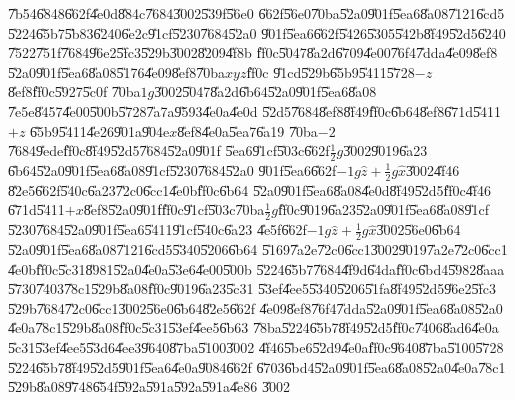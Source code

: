 \U{7b54}\U{6848}\U{662f}\U{4e0d}\U{884c}\U{7684}\U{3002}\U{539f}\U{56e0}%
\U{662f}\U{56e0}\U{70ba}\U{52a0}\U{901f}\U{5ea6}\U{8a08}\U{7121}\U{6cd5}%
\U{5224}\U{65b7}\U{5b83}\U{6240}\U{6e2c}\U{91cf}\U{5230}\U{7684}\U{52a0}%
\U{901f}\U{5ea6}\U{662f}\U{5426}\U{5305}\U{542b}\U{8f49}\U{52d5}\U{6240}%
\U{7522}\U{751f}\U{7684}\U{96e2}\U{5fc3}\U{529b}\U{3002}\U{8209}\U{4f8b}%
\U{ff0c}\U{5047}\U{8a2d}\U{6709}\U{4e00}\U{76f4}\U{7dda}\U{4e09}\U{8ef8}%
\U{52a0}\U{901f}\U{5ea6}\U{8a08}\U{5176}\U{4e09}\U{8ef8}\U{70ba}$xyz$\U{ff0c}%
\U{91cd}\U{529b}\U{65b9}\U{5411}\U{5728}$-z$\U{8ef8}\U{ff0c}\U{5927}\U{5c0f}%
\U{70ba}$1g$\U{3002}\U{5047}\U{8a2d}\U{6b64}\U{52a0}\U{901f}\U{5ea6}\U{8a08}%
\U{7e5e}\U{8457}\U{4e00}\U{500b}\U{5728}\U{7a7a}\U{9593}\U{4e0a}\U{4e0d}%
\U{52d5}\U{7684}\U{8ef8}\U{8f49}\U{ff0c}\U{6b64}\U{8ef8}\U{671d}\U{5411}$+z$%
\U{65b9}\U{5411}\U{4e26}\U{901a}\U{904e}$x$\U{8ef8}\U{4e0a}\U{5ea7}\U{6a19}%
\U{70ba}$-2$\U{7684}\U{9ede}\U{ff0c}\U{8f49}\U{52d5}\U{7684}\U{52a0}\U{901f}%
\U{5ea6}\U{91cf}\U{503c}\U{662f}$\frac{1}{2}g$\U{3002}\U{9019}\U{6a23}%
\U{6b64}\U{52a0}\U{901f}\U{5ea6}\U{8a08}\U{91cf}\U{5230}\U{7684}\U{52a0}%
\U{901f}\U{5ea6}\U{662f}$-1g\hat{z}+\frac{1}{2}g\hat{x}$\U{3002}\U{4f46}%
\U{82e5}\U{662f}\U{540c}\U{6a23}\U{72c0}\U{6cc1}\U{4e0b}\U{ff0c}\U{6b64}%
\U{52a0}\U{901f}\U{5ea6}\U{8a08}\U{4e0d}\U{8f49}\U{52d5}\U{ff0c}\U{4f46}%
\U{671d}\U{5411}$+x$\U{8ef8}\U{52a0}\U{901f}\U{ff0c}\U{91cf}\U{503c}\U{70ba}$%
\frac{1}{2}g$\U{ff0c}\U{9019}\U{6a23}\U{52a0}\U{901f}\U{5ea6}\U{8a08}\U{91cf}%
\U{5230}\U{7684}\U{52a0}\U{901f}\U{5ea6}\U{5411}\U{91cf}\U{540c}\U{6a23}%
\U{4e5f}\U{662f}$-1g\hat{z}+\frac{1}{2}g\hat{x}$\U{3002}\U{56e0}\U{6b64}%
\U{52a0}\U{901f}\U{5ea6}\U{8a08}\U{7121}\U{6cd5}\U{5340}\U{5206}\U{6b64}%
\U{5169}\U{7a2e}\U{72c0}\U{6cc1}\U{3002}\U{9019}\U{7a2e}\U{72c0}\U{6cc1}%
\U{4e0b}\U{ff0c}\U{5c31}\U{8981}\U{52a0}\U{4e0a}\U{53e6}\U{4e00}\U{500b}%
\U{5224}\U{65b7}\U{7684}\U{4f9d}\U{64da}\U{ff0c}\U{6bd4}\U{5982}\U{8aaa}%
\U{5730}\U{7403}\U{78c1}\U{529b}\U{8a08}\U{ff0c}\U{9019}\U{6a23}\U{5c31}%
\U{53ef}\U{4ee5}\U{5340}\U{5206}\U{51fa}\U{8f49}\U{52d5}\U{96e2}\U{5fc3}%
\U{529b}\U{7684}\U{72c0}\U{6cc1}\U{3002}\U{56e0}\U{6b64}\U{82e5}\U{662f}%
\U{4e09}\U{8ef8}\U{76f4}\U{7dda}\U{52a0}\U{901f}\U{5ea6}\U{8a08}\U{52a0}%
\U{4e0a}\U{78c1}\U{529b}\U{8a08}\U{ff0c}\U{5c31}\U{53ef}\U{4ee5}\U{6b63}%
\U{78ba}\U{5224}\U{65b7}\U{8f49}\U{52d5}\U{ff0c}\U{7406}\U{8ad6}\U{4e0a}%
\U{5c31}\U{53ef}\U{4ee5}\U{53d6}\U{4ee3}\U{9640}\U{87ba}\U{5100}\U{3002}%
\U{4f46}\U{5be6}\U{52d9}\U{4e0a}\U{ff0c}\U{9640}\U{87ba}\U{5100}\U{5728}%
\U{5224}\U{65b7}\U{8f49}\U{52d5}\U{901f}\U{5ea6}\U{4e0a}\U{9084}\U{662f}%
\U{6703}\U{6bd4}\U{52a0}\U{901f}\U{5ea6}\U{8a08}\U{52a0}\U{4e0a}\U{78c1}%
\U{529b}\U{8a08}\U{9748}\U{654f}\U{592a}\U{591a}\U{592a}\U{591a}\U{4e86}%
\U{3002}

